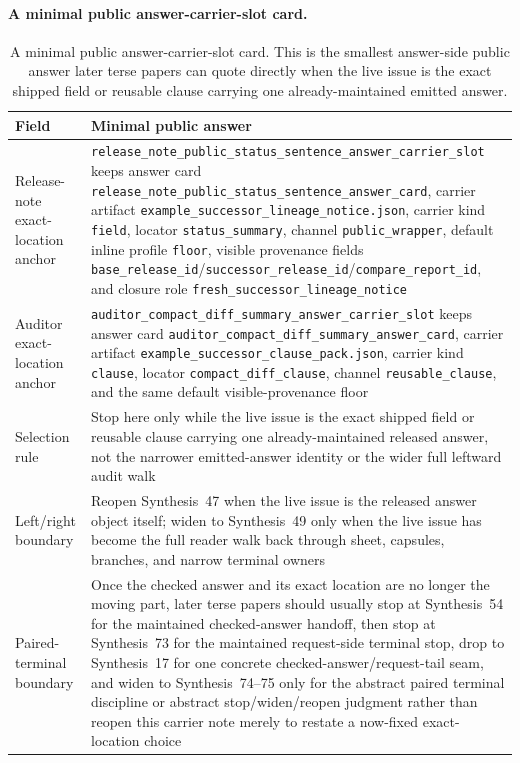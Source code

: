 \documentclass[11pt]{article}
\begin{document}
\paragraph{A minimal public answer-carrier-slot card.}
\begin{table}[t]
\centering
\small
\begin{tabularx}{\linewidth}{@{}lX@{}}
\toprule
Field & Minimal public answer \\
\midrule
Release-note exact-location anchor & \nolinkurl{release_note_public_status_sentence_answer_carrier_slot} keeps answer card \nolinkurl{release_note_public_status_sentence_answer_card}, carrier artifact \nolinkurl{example_successor_lineage_notice.json}, carrier kind \texttt{field}, locator \nolinkurl{status_summary}, channel \nolinkurl{public_wrapper}, default inline profile \texttt{floor}, visible provenance fields \nolinkurl{base_release_id}/\nolinkurl{successor_release_id}/\nolinkurl{compare_report_id}, and closure role \nolinkurl{fresh_successor_lineage_notice} \\
Auditor exact-location anchor & \nolinkurl{auditor_compact_diff_summary_answer_carrier_slot} keeps answer card \nolinkurl{auditor_compact_diff_summary_answer_card}, carrier artifact \nolinkurl{example_successor_clause_pack.json}, carrier kind \texttt{clause}, locator \nolinkurl{compact_diff_clause}, channel \nolinkurl{reusable_clause}, and the same default visible-provenance floor \\
Selection rule & Stop here only while the live issue is the exact shipped field or reusable clause carrying one already-maintained released answer, not the narrower emitted-answer identity or the wider full leftward audit walk \\
Left/right boundary & Reopen Synthesis~47 when the live issue is the released answer object itself; widen to Synthesis~49 only when the live issue has become the full reader walk back through sheet, capsules, branches, and narrow terminal owners \\
Paired-terminal boundary & Once the checked answer and its exact location are no longer the moving part, later terse papers should usually stop at Synthesis~54 for the maintained checked-answer handoff, then stop at Synthesis~73 for the maintained request-side terminal stop, drop to Synthesis~17 for one concrete checked-answer/request-tail seam, and widen to Synthesis~74--75 only for the abstract paired terminal discipline or abstract stop/widen/reopen judgment rather than reopen this carrier note merely to restate a now-fixed exact-location choice \\
\bottomrule
\end{tabularx}
\caption{A minimal public answer-carrier-slot card. This is the smallest answer-side public answer later terse papers can quote directly when the live issue is the exact shipped field or reusable clause carrying one already-maintained emitted answer.}
\label{tab:minimal-public-answer-carrier-slot-card}
\end{table}
\end{document}
